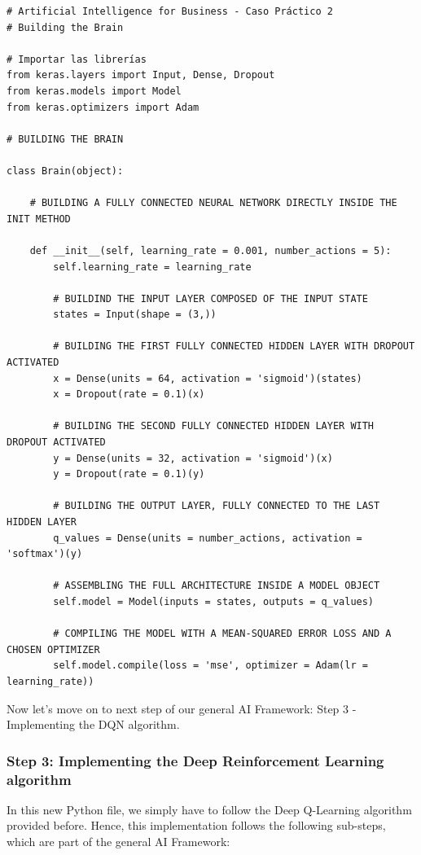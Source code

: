\documentclass[]{book}
\begin{document}
\begin{lstlisting}
# Artificial Intelligence for Business - Caso Práctico 2
# Building the Brain

# Importar las librerías
from keras.layers import Input, Dense, Dropout
from keras.models import Model
from keras.optimizers import Adam

# BUILDING THE BRAIN

class Brain(object):
    
    # BUILDING A FULLY CONNECTED NEURAL NETWORK DIRECTLY INSIDE THE INIT METHOD
    
    def __init__(self, learning_rate = 0.001, number_actions = 5):
        self.learning_rate = learning_rate
        
        # BUILDIND THE INPUT LAYER COMPOSED OF THE INPUT STATE
        states = Input(shape = (3,))
        
        # BUILDING THE FIRST FULLY CONNECTED HIDDEN LAYER WITH DROPOUT ACTIVATED
        x = Dense(units = 64, activation = 'sigmoid')(states)
        x = Dropout(rate = 0.1)(x)
        
        # BUILDING THE SECOND FULLY CONNECTED HIDDEN LAYER WITH DROPOUT ACTIVATED
        y = Dense(units = 32, activation = 'sigmoid')(x)
        y = Dropout(rate = 0.1)(y)
        
        # BUILDING THE OUTPUT LAYER, FULLY CONNECTED TO THE LAST HIDDEN LAYER
        q_values = Dense(units = number_actions, activation = 'softmax')(y)
        
        # ASSEMBLING THE FULL ARCHITECTURE INSIDE A MODEL OBJECT
        self.model = Model(inputs = states, outputs = q_values)
        
        # COMPILING THE MODEL WITH A MEAN-SQUARED ERROR LOSS AND A CHOSEN OPTIMIZER
        self.model.compile(loss = 'mse', optimizer = Adam(lr = learning_rate))
\end{lstlisting}

Now let's move on to next step of our general AI Framework: Step 3 - Implementing the DQN algorithm.

\newpage

\subsubsection{Step 3: Implementing the Deep Reinforcement Learning algorithm}

In this new Python file, we simply have to follow the Deep Q-Learning algorithm provided before. Hence, this implementation follows the following sub-steps, which are part of the general AI Framework:
\end{document}
